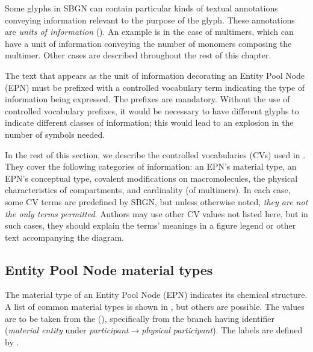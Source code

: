 
Some glyphs in SBGN \PDs can contain particular kinds of textual annotations conveying information relevant to the purpose of the glyph.  These annotations are \emph{units of information} ().  An example is in the case of multimers, which can have a unit of information conveying the number of monomers composing the multimer.  Other cases are described throughout the rest of this chapter.

The text that appears as the unit of information decorating an Entity Pool Node (EPN) must be prefixed with a controlled vocabulary term indicating the type of information being expressed.  The prefixes are mandatory.  Without the use of controlled vocabulary prefixes, it would be necessary to have different glyphs to indicate different classes of information; this would lead to an explosion in the number of symbols needed.

In the rest of this section, we describe the controlled vocabularies (CVs) used in \SBGNPDLone.  They cover the following categories of information: an EPN's material type, an EPN's conceptual type, covalent modifications on macromolecules, the physical characteristics of compartments, and cardinality (\eg of multimers).  In each case, some CV terms are predefined by SBGN, but unless otherwise noted, \emph{they are not the only terms permitted}.  Authors may use other CV values not listed here, but in such cases, they should explain the terms' meanings in a figure legend or other text accompanying the diagram.


\subsection{Entity Pool Node material types}
\label{sec:material-types-cv}

The material type of an Entity Pool Node (EPN) indicates its chemical structure.  A list of common material types is shown in , but others are possible.  The values are to be taken from the \sbo (\sbourl), specifically from the branch having identifier  (\emph{material entity} under \emph{participant}$\rightarrow$\emph{physical participant}).  The labels are defined by \SBGNPDLone.

